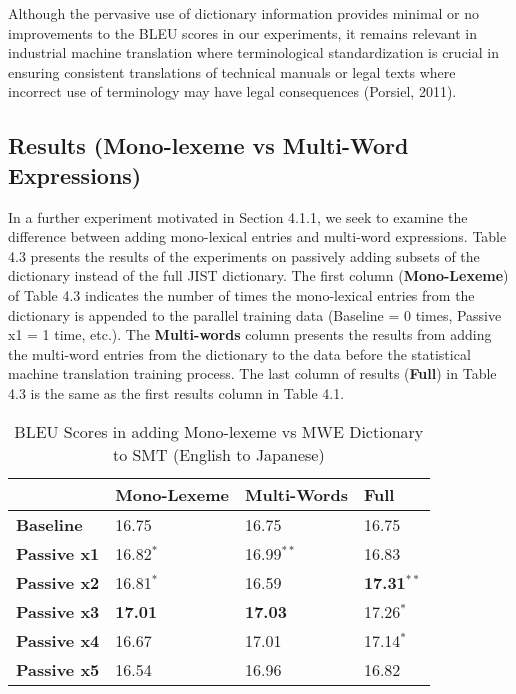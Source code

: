 Although the pervasive use of dictionary information provides minimal or no improvements to the BLEU scores in our experiments, it remains relevant in industrial machine translation where terminological standardization is crucial in ensuring consistent translations of technical manuals or legal texts where incorrect use of terminology may have legal consequences (Porsiel, 2011).

\subsection{Results (Mono-lexeme vs Multi-Word Expressions)}

In a further experiment motivated in Section 4.1.1, we seek to examine the difference between adding mono-lexical entries and multi-word expressions. Table 4.3 presents the results of the experiments on passively adding subsets of the dictionary instead of the full JIST dictionary. The first column (\textbf{Mono-Lexeme}) of Table 4.3 indicates the number of times the mono-lexical entries from the dictionary is appended to the parallel training data (Baseline = 0 times, Passive x1 = 1 time, etc.). The \textbf{Multi-words} column presents the results from adding the multi-word entries from the dictionary to the data before the statistical machine translation training process. The last column of results (\textbf{Full}) in Table 4.3 is the same as the first results column in Table 4.1.

\begin{table}[H]
\centering
    \begin{tabular}{l|lll}
         ~               & \textbf{Mono-Lexeme} & \textbf{Multi-Words} & \textbf{Full} \\ \hline
\textbf{Baseline}        & 16.75      & 16.75      & 16.75  \\ \hline
    \textbf{Passive x1}  & 16.82$^{*}$       & 16.99$^{**}$   & 16.83     \\
    \textbf{Passive x2}  & 16.81$^{*}$       & 16.59     & \textbf{17.31$^{**}$}  \\
    \textbf{Passive x3}  & \textbf{17.01}    & \textbf{17.03}     &  17.26$^{*}$  \\
    \textbf{Passive x4}  & 16.67       & 17.01    & 17.14$^{*}$   \\
    \textbf{Passive x5}  & 16.54       & 16.96    & 16.82   \\
    \end{tabular}
\caption{BLEU Scores in adding Mono-lexeme vs MWE Dictionary to SMT (English to Japanese)}
\label{table:mumtttaenja}
\end{table}

